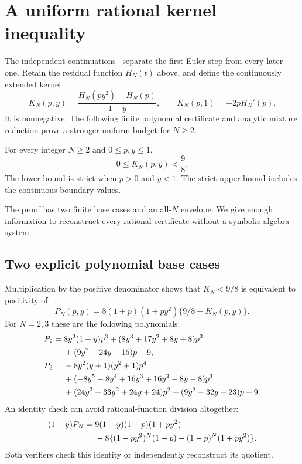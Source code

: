 \section{A uniform rational kernel inequality}
\label{latebudget:sec:ineq}
The independent continuations~\cite{latebudget:sharp,latebudget:golden}
separate the first Euler step from every later one. Retain the residual
function $H_N(t)$ above, and define the continuously extended kernel
\[
 K_N(p,y)=\frac{H_N(py^2)-H_N(p)}{1-y},\qquad
 K_N(p,1)=-2pH_N'(p).
\]
It is nonnegative. The following finite polynomial certificate and analytic
mixture reduction prove a stronger uniform budget for $N\ge2$.

\begin{theorem}\label{latebudget:thm:kernel}
For every integer $N\ge2$ and $0\le p,y\le1$,
\begin{equation}\label{latebudget:eq:kernel-bound}
 0\le K_N(p,y)<\frac98.
\end{equation}
The lower bound is strict when $p>0$ and $y<1$. The strict upper bound includes the continuous boundary values.
\end{theorem}
The proof has two finite base cases and an all-$N$ envelope. We give enough information to reconstruct every rational certificate without a symbolic algebra system.

\subsection{Two explicit polynomial base cases}
Multiplication by the positive denominator shows that $K_N<9/8$ is equivalent to positivity of
\[
 P_N(p,y)=8(1+p)(1+py^2)\{9/8-K_N(p,y)\}.
\]
For $N=2,3$ these are the following polynomials:
\begin{align}
P_2={}&8y^2(1+y)p^3+(8y^3+17y^2+8y+8)p^2\notag\\
&+(9y^2-24y-15)p+9,\label{latebudget:eq:P2}\\
P_3={}&-8y^2(y+1)(y^2+1)p^4\notag\\
&+(-8y^5-8y^4+16y^3+16y^2-8y-8)p^3\notag\\
&+(24y^3+33y^2+24y+24)p^2
 +(9y^2-32y-23)p+9.\label{latebudget:eq:P3}
\end{align}
An identity check can avoid rational-function division altogether:
\begin{align}\label{latebudget:eq:polynomial-check}
(1-y)P_N={}&9(1-y)(1+p)(1+py^2)\notag\\
&-8\{(1-py^2)^N(1+p)-(1-p)^N(1+py^2)\}.
\end{align}
Both verifiers check this identity or independently reconstruct its quotient.

